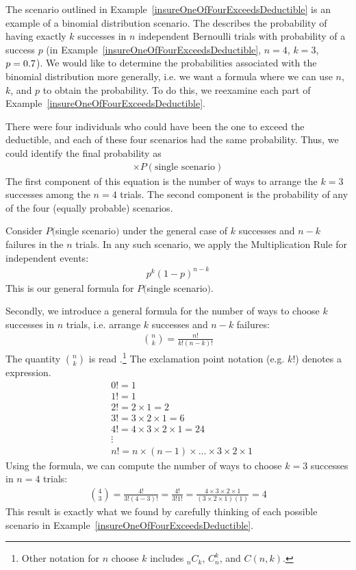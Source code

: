 The scenario outlined in Example~\ref{insureOneOfFourExceedsDeductible} is an
example of a binomial distribution scenario.
The 
describes the probability of having exactly $k$ successes
in $n$ independent Bernoulli trials with probability
of a success $p$
(in Example~\ref{insureOneOfFourExceedsDeductible},
$n=4$, $k=3$, $p=0.7{}$).
We would like to determine the probabilities associated
with the binomial distribution more generally,
i.e. we want a formula where we can use $n$, $k$, and $p$
to obtain the probability.
To do this, we reexamine each part of
Example~\ref{insureOneOfFourExceedsDeductible}.

There were four individuals who could have been the one
to exceed the deductible, and each of these four scenarios
had the same probability.
Thus, we could identify the final probability as
\begin{align*}
[\text{\# of scenarios}] \times P(\text{single scenario})
\end{align*}
The first component of this equation is the number of ways
to arrange the $k=3$ successes among the $n=4$ trials.
The second component is the probability of any of the four
(equally probable) scenarios.

Consider $P($single scenario$)$ under the general case of
$k$ successes and $n-k$ failures in the $n$ trials.
In any such scenario, we apply the Multiplication Rule
for independent events:
\begin{align*}
p^k (1 - p)^{n - k}
\end{align*}
This is our general formula for $P($single scenario$)$.

Secondly, we introduce a general formula for the number
of ways to choose $k$ successes in $n$ trials,
i.e. arrange $k$ successes and $n - k$ failures:
\begin{align*}
{n\choose k} = \frac{n!}{k! (n - k)!}
\end{align*}
The quantity ${n\choose k}$ is read
.\footnote{Other notation for
  $n$ choose $k$ includes $_nC_k$, $C_n^k$, and $C(n,k)$.}
The exclamation point notation (e.g. $k!$) denotes
a  expression.\label{factorial_defined}
\begin{align*}
& 0! = 1 \\
& 1! = 1 \\
& 2! = 2\times1 = 2 \\
& 3! = 3\times2\times1 = 6 \\
& 4! = 4\times3\times2\times1 = 24 \\
& \vdots \\
& n! = n\times(n-1)\times...\times3\times2\times1
\end{align*}
Using the formula, we can compute the number of ways
to choose $k = 3$ successes in $n = 4$ trials:
\begin{align*}
{4 \choose 3} = \frac{4!}{3!(4-3)!}
  = \frac{4!}{3!1!} 
  = \frac{4\times3\times2\times1}{(3\times2\times1) (1)}
  = 4
\end{align*}
This result is exactly what we found by carefully thinking
of each possible scenario in
Example~\ref{insureOneOfFourExceedsDeductible}.

